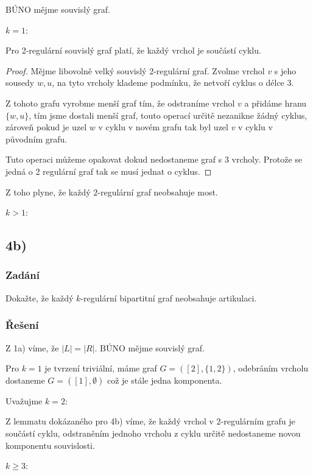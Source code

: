 \documentclass[../main.tex]{subfiles}
\begin{document}
BÚNO mějme souvislý graf. 

$k = 1$:
\begin{lemma*}
    Pro 2-regulární souvislý graf platí, že každý vrchol je součástí cyklu. 
\end{lemma*}
\begin{proof}
    Mějme libovolně velký souvislý 2-regulární graf. 
    Zvolme vrchol $v$ s jeho sousedy $w,u$, 
    na tyto vrcholy klademe podmínku, že netvoří cyklus o délce 3. 
    
    Z tohoto grafu vyrobme menší graf tím, že odstraníme vrchol $v$ a přidáme hranu $\{w,u\}$, tím jsme dostali menší graf, touto operací určitě nezanikne žádný cyklus, zároveň pokud je uzel $w$ v cyklu v novém grafu tak byl uzel $v$  v cyklu v původním grafu. 
    
    Tuto operaci můžeme opakovat dokud nedostaneme graf s 3 vrcholy. Protože se jedná o 2 regulární graf tak se musí jednat o cyklus. 
\end{proof}

Z toho plyne, že každý $2$-regulární graf neobsahuje  most. 

$k>1$:






\subsection{4b)}
\subsubsection*{Zadání}
Dokažte, že každý $k$-regulární bipartitní graf neobsahuje artikulaci.

\subsubsection*{Řešení}

Z 1a) víme, že  $|L|=|R|$. BÚNO mějme souvislý graf. 

Pro $k=1$ je tvrzení triviální, máme graf $G=([2], \{1,2\})$, odebráním vrcholu dostaneme $G=([1], \emptyset)$ což je stále jedna komponenta.

Uvažujme $k=2$: 

Z lemmatu dokázaného pro 4b) víme, že každý vrchol v 2-regulárním grafu je součástí cyklu, 
odstraněním jednoho vrcholu z cyklu určitě nedostaneme novou komponentu souvislosti.

$k\geq 3$:
\end{document}
